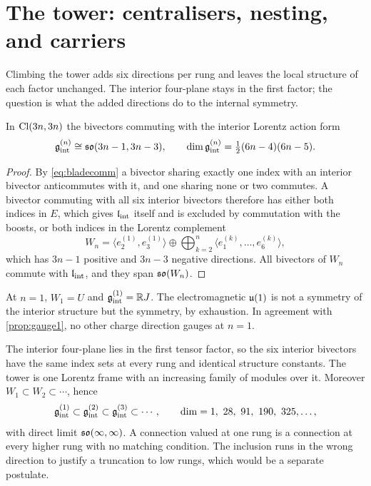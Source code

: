\section{The tower: centralisers, nesting, and carriers}
\label{sec:tower}

Climbing the tower adds six directions per rung and leaves the local structure of each factor unchanged. The interior four-plane
stays in the first factor; the question is what the added directions do to the internal symmetry.

\begin{theorem}
\label{thm:centraliser}
In $\mathrm{Cl}(3n,3n)$ the bivectors commuting with the interior Lorentz action form
\[
\mathfrak g_{\rm int}^{(n)}\cong\mathfrak{so}(3n-1,3n-3),\qquad \dim\mathfrak g_{\rm int}^{(n)}=\tfrac12(6n-4)(6n-5).
\]
\end{theorem}

\begin{proof}
By \eqref{eq:bladecomm} a bivector sharing exactly one index with an interior bivector anticommutes with it, and one sharing none
or two commutes. A bivector commuting with all six interior bivectors therefore has either both indices in $E$, which gives
$\mathfrak l_{\rm int}$ itself and is excluded by commutation with the boosts, or both indices in the Lorentz complement
\[
W_n=\langle e^{(1)}_2,e^{(1)}_3\rangle\oplus\bigoplus_{k=2}^n\langle e^{(k)}_1,\dots,e^{(k)}_6\rangle ,
\]
which has $3n-1$ positive and $3n-3$ negative directions. All bivectors of $W_n$ commute with $\mathfrak l_{\rm int}$, and they span $\mathfrak{so}(W_n)$.
\end{proof}

\begin{corollary}
\label{cor:photon1}
At $n=1$, $W_1=U$ and $\mathfrak g_{\rm int}^{(1)}=\mathbb{R} J$. The electromagnetic $\mathfrak{u}(1)$ is not a symmetry of the interior structure but the
symmetry, by exhaustion. In agreement with \cref{prop:gauge1}, no other charge direction gauges at $n=1$.
\end{corollary}

\begin{proposition}
\label{prop:frame}
The interior four-plane lies in the first tensor factor, so the six interior bivectors have the same index sets at every rung and
identical structure constants. The tower is one Lorentz frame with an increasing family of modules over it. Moreover
$W_1\subset W_2\subset\cdots$, hence
\[
\mathfrak g_{\rm int}^{(1)}\subset\mathfrak g_{\rm int}^{(2)}\subset\mathfrak g_{\rm int}^{(3)}\subset\cdots,\qquad \dim=1,\ 28,\ 91,\ 190,\ 325,\dots,
\]
with direct limit $\mathfrak{so}(\infty,\infty)$. A connection valued at one rung is a connection at every higher rung with no matching
condition. The inclusion runs in the wrong direction to justify a truncation to low rungs, which would be a separate postulate.
\end{proposition}

